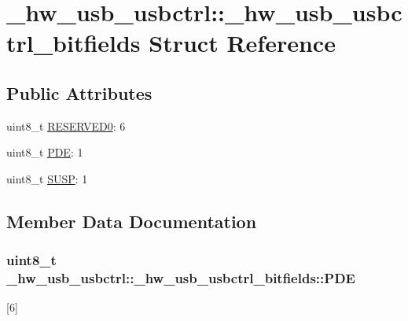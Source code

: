 \hypertarget{struct__hw__usb__usbctrl_1_1__hw__usb__usbctrl__bitfields}{}\section{\+\_\+hw\+\_\+usb\+\_\+usbctrl\+:\+:\+\_\+hw\+\_\+usb\+\_\+usbctrl\+\_\+bitfields Struct Reference}
\label{struct__hw__usb__usbctrl_1_1__hw__usb__usbctrl__bitfields}
\subsection*{Public Attributes}
\begin{DoxyCompactItemize}
\item 
uint8\+\_\+t \hyperlink{struct__hw__usb__usbctrl_1_1__hw__usb__usbctrl__bitfields_a4caec343f7dbb17f67dc46427681b3fe}{R\+E\+S\+E\+R\+V\+E\+D0}\+: 6
\item 
uint8\+\_\+t \hyperlink{struct__hw__usb__usbctrl_1_1__hw__usb__usbctrl__bitfields_a5d2ba2ab232266617f5e7c51e01d8567}{P\+DE}\+: 1
\item 
uint8\+\_\+t \hyperlink{struct__hw__usb__usbctrl_1_1__hw__usb__usbctrl__bitfields_af63c90bffb13ef467b33c7667e3d90f3}{S\+U\+SP}\+: 1
\end{DoxyCompactItemize}


\subsection{Member Data Documentation}
\subsubsection[{\texorpdfstring{P\+DE}{PDE}}]{\setlength{\rightskip}{0pt plus 5cm}uint8\+\_\+t \+\_\+hw\+\_\+usb\+\_\+usbctrl\+::\+\_\+hw\+\_\+usb\+\_\+usbctrl\+\_\+bitfields\+::\+P\+DE}\hypertarget{struct__hw__usb__usbctrl_1_1__hw__usb__usbctrl__bitfields_a5d2ba2ab232266617f5e7c51e01d8567}{}\label{struct__hw__usb__usbctrl_1_1__hw__usb__usbctrl__bitfields_a5d2ba2ab232266617f5e7c51e01d8567}
\mbox{[}6\mbox{]} 
